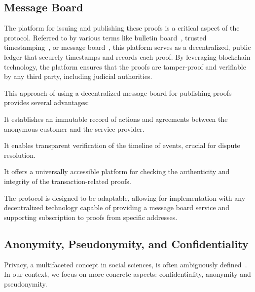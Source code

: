 \documentclass[pdftex,twocolumn,epjc3]{svjour3}
\begin{document}
\subsection{Message Board}\label{sec:message-board}
The platform for issuing and publishing these proofs is a critical aspect of the protocol. Referred to by various terms like bulletin board~\cite{achenbachImprovedCoercionresistantElectronic2015}, trusted timestamping~\cite{gippDecentralizedTrustedTimestamping2015}, or message board~\cite{hinarejosSolutionSecureCertified2019}, this platform serves as a decentralized, public ledger that securely timestamps and records each proof. By leveraging blockchain technology, the platform ensures that the proofs are tamper-proof and verifiable by any third party, including judicial authorities.

This approach of using a decentralized message board for publishing proofs provides several advantages:
\begin{itemize}
    \item It establishes an immutable record of actions and agreements between the anonymous customer and the service provider.
    \begin{sloppypar}
    \item It enables transparent verification of the timeline of events, crucial for dispute resolution.
    \end{sloppypar}
    \item It offers a universally accessible platform for checking the authenticity and integrity of the transaction-related proofs.
\end{itemize}

The protocol is designed to be adaptable, allowing for implementation with any decentralized technology capable of providing a message board service and supporting subscription to proofs from specific addresses.

\subsection{Anonymity, Pseudonymity, and Confidentiality}\label{sec:pseudo-anon}

\begin{sloppypar}
Privacy, a multifaceted concept in social sciences, is often ambiguously defined~\cite{smithInformationPrivacyResearch2011}. In our context, we focus on more concrete aspects: confidentiality, anonymity and pseudonymity.
\end{sloppypar}
\end{document}
